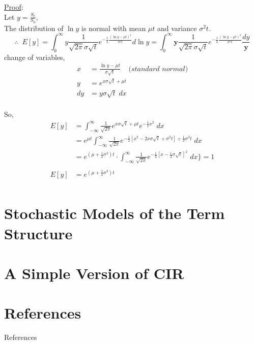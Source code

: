 \documentclass[
14pt,notheorems,hyperref={pdfauthor=whatever}
]{beamer}
\begin{document}
\begin{frame}
\underline{Proof}:\\
\hfill\break
Let $y = \frac{S_t}{S_0}$,\\
The distribution of $\ln{y}$ is normal with mean $\mu t$ and variance $\sigma^2t$.\\
\[ \therefore \;\; E[y] = \int_0^\infty y \frac{1}{\sqrt{2\pi}\sigma\sqrt{t}} e^{-\frac{1}{2}\frac{(\ln y - \mu t)^2}{\sigma^2 t}} d\ln{y} = \int_0^\infty \bm{y} \frac{1}{\sqrt{2\pi}\sigma\sqrt{t}} e^{-\frac{1}{2}\frac{(\ln y - \mu t)^2}{\sigma^2 t}} \frac{dy}{\bm{y}} \]
change of variables,
\begin{align*}
    x &= \frac{\ln y - \mu t}{\sigma \sqrt{t}} \;\;\;\; \textit{(standard normal)}\\
    y &= e^{x\sigma\sqrt{t}+\mu t}\\
    dy &= y\sigma\sqrt{t}\;dx\\
\end{align*}
\end{frame}

\begin{frame}
So,
\begin{align*}
    E[y] &= \int_{-\infty}^\infty \frac{1}{\sqrt{2\pi}} e^{x\sigma \sqrt{t} + \mu t} e^{-\frac{1}{2} x^2} \; dx\\
    &= e^{\mu t} \int_{-\infty}^\infty \frac{1}{\sqrt{2\pi}} e^{-\frac{1}{2}[x^2-2x\sigma \sqrt{t} + \sigma^2 t] + \frac{1}{2}\sigma^2 t}\;dx\\
    &= e^{(\mu+\frac{1}{2}\sigma^2)t} \cdot \int_{-\infty}^\infty \frac{1}{\sqrt{2\pi}} e^{-\frac{1}{2}[x-\frac{1}{2}\sigma\sqrt{t}]^2}\;dx \bigg\} = 1\\
    &\\
    E[y] &= e^{(\mu+\frac{1}{2}\sigma^2)t}\\
\end{align*}
\end{frame}

\section{Stochastic Models of the Term Structure}

\section{A Simple Version of CIR}

\section*{References}
\begin{frame}[allowframebreaks]{References}
    \printbibliography
\end{frame}
\end{document}
